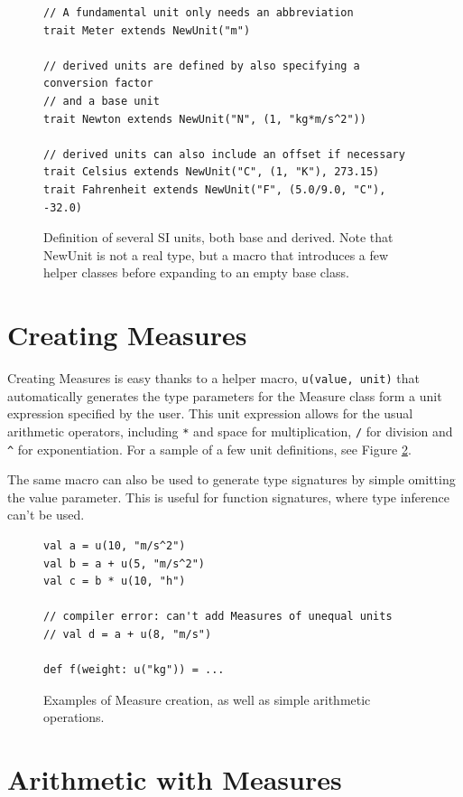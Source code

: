 \documentclass[12pt,oneside,a4paper]{scrbook}
\begin{document}
\begin{figure}
\begin{verbatim}
// A fundamental unit only needs an abbreviation
trait Meter extends NewUnit("m")

// derived units are defined by also specifying a conversion factor
// and a base unit
trait Newton extends NewUnit("N", (1, "kg*m/s^2"))

// derived units can also include an offset if necessary
trait Celsius extends NewUnit("C", (1, "K"), 273.15)
trait Fahrenheit extends NewUnit("F", (5.0/9.0, "C"), -32.0)
\end{verbatim}
\caption{Definition of several SI units, both base and derived. Note that NewUnit is not a real type, but a macro that introduces a few helper classes before expanding to an empty base class.}
\label{code:scala_define_units}
\end{figure}

\section{Creating Measures}
\label{sec:measure_creation}

Creating Measures is easy thanks to a helper macro, \verb|u(value, unit)| that automatically generates the type parameters for the Measure class form a unit expression specified by the user. This unit expression allows for the usual arithmetic operators, including \verb|*| and space for multiplication, \verb|/| for division and \verb|^| for exponentiation. For a sample of a few unit definitions, see Figure \ref{code:scala_create_measure}.

The same macro can also be used to generate type signatures by simple omitting the value parameter. This is useful for function signatures, where type inference can't be used.

\begin{figure}
\begin{verbatim}
val a = u(10, "m/s^2")
val b = a + u(5, "m/s^2")
val c = b * u(10, "h")

// compiler error: can't add Measures of unequal units
// val d = a + u(8, "m/s")

def f(weight: u("kg")) = ...
\end{verbatim}
\caption{Examples of Measure creation, as well as simple arithmetic operations.}
\label{code:scala_create_measure}
\end{figure}

\section{Arithmetic with Measures}
\end{document}
